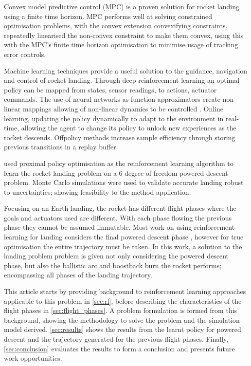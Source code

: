 Convex model predictive control (MPC) \cite{Wang2018} is a proven solution for rocket landing using a finite time horizon. MPC performs well at solving constrained optimisation problems, with the convex extension convexifying constraints. \cite{Wang2018} repeatedly linearised the non-convex constraint to make them convex, using this with the MPC's finite time horizon optimisation to minimise usage of tracking error controls.

Machine learning techniques provide a useful solution to the guidance, navigation and control of rocket landing. Through deep reinforcement learning \cite{sutton1998reinforcement} an optimal policy can be mapped from states, sensor readings, to actions, actuator commands. The use of neural networks as function approximators \cite{sutton2000policy} create non-linear mappings allowing of non-linear dynamics to be controlled \cite{mnih2015human}. Online learning, updating the policy dynamically to adapt to the environment in real-time, allowing the agent to change its policy to unlock new experiences as the rocket descends. Offpolicy methods increase sample efficiency through storing previous transitions in a replay buffer.

\cite{Gaudet2018} used proximal policy optimisation as the reinforcement learning algorithm to learn the rocket landing problem on a 6 degree of freedom powered descent problem. Monte Carlo simulations were used to validate accurate landing robust to uncertainties; showing feasibility to the method application.

Focusing on an Earth landing, the rocket has different flight phases \cite{Botelho2022} where the goals and actuators used are different. With each phase flowing the previous phase they cannot be assumed immutable. Most work on using reinforcement learning for landing considers the final powered descent phase \cite{Gaudet2018}, however for true optimisation the entire trajectory must be taken. In this work, a solution to the landing problem problem is given not only considering the powered descent phase, but also the ballistic arc and boostback burn the rocket performs; encompassing all phases of the landing trajectory.


This article starts by providing background to reinforcement learning approaches applicable to this problem in \autoref{sec:rl}, before describing the characteristics of the flight phases in \autoref{sec:flight_phases}. A problem formulation is formed from this background, showing the methodology to solve the problem and the simulation model derived. \autoref{sec:results} shows the results from the learnt policy for powered descent and the trajectory generated for the previous flight phases. Finally, \autoref{sec:conclusion} evaluates the results to form a conclusion and presents future work opportunities.
